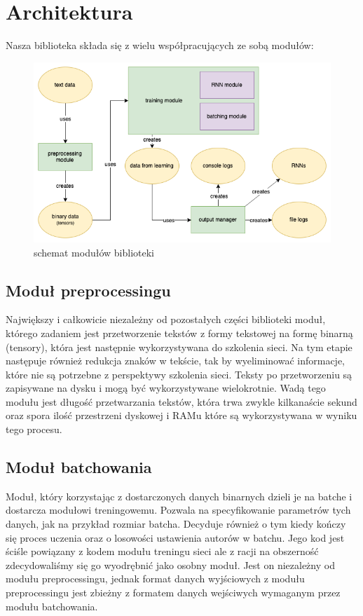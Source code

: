 \newpage
\section{Architektura}
Nasza biblioteka składa się z wielu współpracujących ze sobą modułów:
\begin{figure}[!ht]
\includegraphics[width=\linewidth]{./images/modules.png}
\caption{schemat modułów biblioteki}
\label{fig:test3}
\end{figure}

\subsection{Moduł preprocessingu}
Największy i całkowicie niezależny od pozostałych części biblioteki moduł, którego zadaniem jest 
przetworzenie tekstów z formy tekstowej na formę binarną (tensory), która jest następnie wykorzystywana
do szkolenia sieci. Na tym etapie następuje również redukcja znaków w tekście, tak by wyeliminować
informacje, które nie są potrzebne z perspektywy szkolenia sieci. Teksty po przetworzeniu są 
zapisywane na dysku i mogą być wykorzystywane wielokrotnie. 
Wadą tego modułu jest długość przetwarzania tekstów, która trwa zwykle kilkanaście sekund oraz spora ilość
przestrzeni dyskowej i RAMu które są wykorzystywana w wyniku tego procesu.

\subsection{Moduł batchowania}
Moduł, który korzystając z dostarczonych danych binarnych dzieli je na batche i dostarcza modułowi treningowemu.
Pozwala na specyfikowanie parametrów tych danych, jak na przykład rozmiar batcha.
Decyduje również o tym kiedy kończy się proces uczenia oraz o losowości ustawienia autorów w batchu. 
Jego kod jest ściśle powiązany z kodem modułu treningu sieci ale z racji na obszerność zdecydowaliśmy 
się go wyodrębnić jako osobny moduł. 
Jest on niezależny od modułu preprocessingu, jednak format danych wyjściowych z modułu preprocessingu 
jest zbieżny z formatem danych wejściwych wymaganym przez modułu batchowania. 

